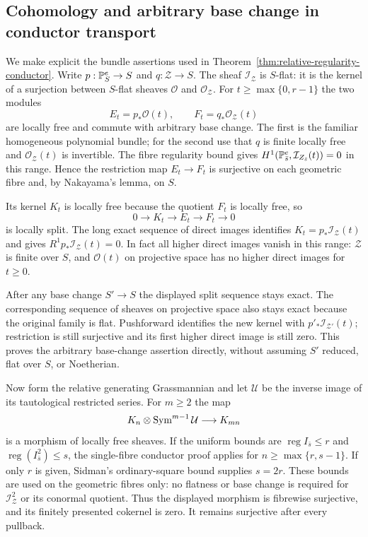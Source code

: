 \subsection{Cohomology and arbitrary base change in conductor transport}
\label{sec:relative-cohomology-details}
We make explicit the bundle assertions used in
Theorem~\ref{thm:relative-regularity-conductor}. Write
$p:\mathbb P^e_S\to S$ and $q:\mathcal Z\to S$. The sheaf
$\mathcal I_{\mathcal Z}$ is $S$-flat: it is the kernel of a
surjection between $S$-flat sheaves $\mathcal O$ and
$\mathcal O_{\mathcal Z}$. For
$t\ge\max\{0,r-1\}$ the two modules
\[
 E_t=p_*\mathcal O(t),\qquad F_t=q_*\mathcal O_{\mathcal Z}(t)
\]
are locally free and commute with arbitrary base change. The first
is the familiar homogeneous polynomial bundle; for the second use
that $q$ is finite locally free and $\mathcal O_{\mathcal Z}(t)$
is invertible. The fibre regularity bound gives
$H^1(\mathbb P^e_{\bar s},\mathcal I_{Z_{\bar s}}(t))=0$ in this range.
Hence the restriction map $E_t\to F_t$ is surjective on each
geometric fibre and, by Nakayama's lemma, on $S$.

Its kernel $K_t$ is locally free because the quotient $F_t$ is
locally free, so
\[
 0\longrightarrow K_t\longrightarrow E_t\longrightarrow F_t
             \longrightarrow0
\]
is locally split. The long exact sequence of direct images identifies
$K_t=p_*\mathcal I_{\mathcal Z}(t)$ and gives
$R^1p_*\mathcal I_{\mathcal Z}(t)=0$. In fact all higher direct
images vanish in this range: $\mathcal Z$ is finite over $S$,
and $\mathcal O(t)$ on projective space has no higher direct
images for $t\ge0$.

After any base change $S'\to S$ the displayed split sequence stays
exact. The corresponding sequence of sheaves on projective space
also stays exact because the original family is flat. Pushforward
identifies the new kernel with $p'_*\mathcal I_{\mathcal Z'}(t)$;
restriction is still surjective and its first higher direct image
is still zero. This proves the arbitrary base-change assertion
directly, without assuming $S'$ reduced, flat over $S$, or
Noetherian.

Now form the relative generating Grassmannian and let $\mathcal U$
be the inverse image of its tautological restricted series. For
$m\ge2$ the map
\[
 K_n\otimes\operatorname{Sym}^{m-1}\mathcal U\longrightarrow K_{mn}
\]
is a morphism of locally free sheaves. If the uniform bounds are
$\operatorname{reg}I_{\bar s}\le r$ and
$\operatorname{reg}(I_{\bar s}^2)\le s$, the single-fibre conductor
proof applies for $n\ge\max\{r,s-1\}$. If only $r$ is given,
Sidman's ordinary-square bound supplies $s=2r$. These bounds are
used on the geometric fibres only: no flatness or base change is
required for $\mathcal I_{\mathcal Z}^2$ or its conormal quotient.
Thus the displayed morphism is fibrewise surjective, and its
finitely presented cokernel is zero. It remains surjective after
every pullback.

